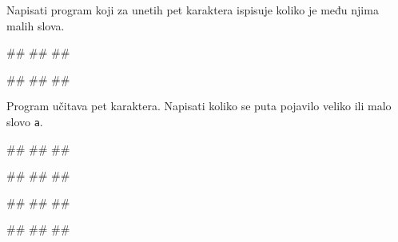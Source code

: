 \begin{Exercise}[label=p1.2_07] 
Napisati program koji za unetih pet karaktera ispisuje koliko je među njima malih slova.

\begin{miditest}
\begin{upotreba}{1}
#\naslovInt#
##
##
\end{upotreba}
\end{miditest}
\begin{miditest}
\begin{upotreba}{2}
#\naslovInt#
##
##
\end{upotreba}
\end{miditest}

\end{Exercise}
\begin{Answer}[ref=p1.2_07]
\end{Answer}


\begin{Exercise}[label=p1.6_] 
Program učitava pet karaktera. Napisati koliko
se puta pojavilo veliko ili malo slovo \verb|a|. 

\begin{miditest}
\begin{upotreba}{1}
#\naslovInt#
##
##
\end{upotreba}
\end{miditest}
\begin{miditest}
\begin{upotreba}{2}
#\naslovInt#
##
##
\end{upotreba}
\end{miditest}

\begin{miditest}
\begin{upotreba}{3}
#\naslovInt#
##
##
\end{upotreba}
\end{miditest}
\begin{miditest}
\begin{upotreba}{4}
#\naslovInt#
##
##
\end{upotreba}
\end{miditest}
\end{Exercise}
\begin{Answer}[ref=p1.6_]
\end{Answer}


